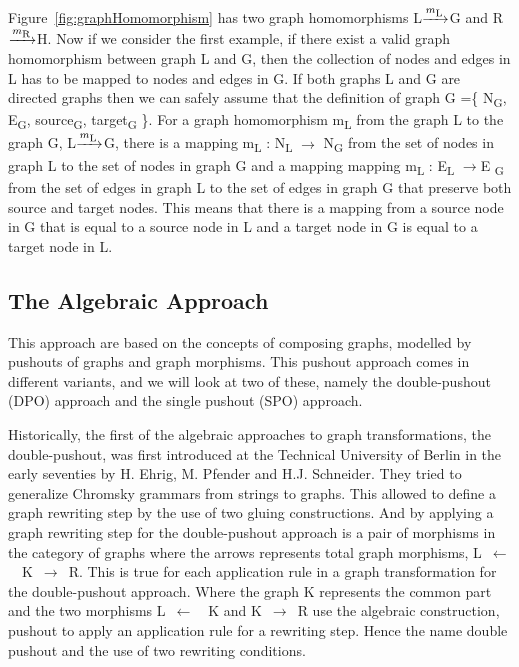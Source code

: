 Figure~\ref{fig:graphHomomorphism} has two graph homomorphisms
\mbox{L$\xrightarrow{m\textsubscript{L}}$G} and 
\mbox{R$\xrightarrow{m\textsubscript{R}}$H}. Now if we consider the first
example, if there exist a valid graph homomorphism between graph L and G,
then the collection of nodes and edges in L has to be mapped to nodes and edges
in G. If both graphs L and G are directed graphs then we can safely assume that
the definition of graph G =\{ N\textsubscript{G}, E\textsubscript{G},
source\textsubscript{G}, target\textsubscript{G} \}. For a graph homomorphism
m\textsubscript{L} from the graph L to the graph G,
\mbox{L$\xrightarrow{m\textsubscript{L}}$G}, there is a mapping
m\textsubscript{L} : N\textsubscript{L} $\longrightarrow$ N\textsubscript{G}
from the set of nodes in graph L to the set of nodes in graph G and a mapping
mapping m\textsubscript{L} : E\textsubscript{L} $\longrightarrow$E
\textsubscript{G} from the set of edges in graph L to the set of edges in graph
G that preserve both source and target nodes. This means that there is a
mapping from a source node in G that is equal to a source node in L and a
target node in G is equal to a target node in L.

\subsection{The Algebraic Approach}
This approach are based on the concepts of composing graphs, modelled
by pushouts of graphs and graph morphisms. This pushout approach comes in
different variants, and we will look at two of these, namely the
double-pushout (DPO) approach and the single pushout (SPO)
approach\cite{Loewe1997,Ehrig1997}.

Historically, the first of the algebraic approaches to graph
transformations, the double-pushout, was first introduced at the Technical
University of Berlin in the early seventies by H. Ehrig, M. Pfender and H.J.
Schneider\cite{INSPEC:606170}. They tried to generalize Chromsky grammars from
strings to graphs. This allowed to define a graph rewriting step by the use of
two gluing constructions. And by applying a graph rewriting step for the
double-pushout approach is a pair of morphisms in the category of graphs where
the arrows represents total graph morphisms, \mbox{L $\longleftarrow$
\ K $\longrightarrow$ R}. This is true for each application rule in a graph
transformation for the double-pushout approach. Where the graph K represents the
common part and the two morphisms \mbox{L $\longleftarrow$ \ K} and \mbox{K
$\longrightarrow$ R} use the algebraic construction, pushout to apply an
application rule for a rewriting step. Hence the name double pushout and the use
of two rewriting conditions.

